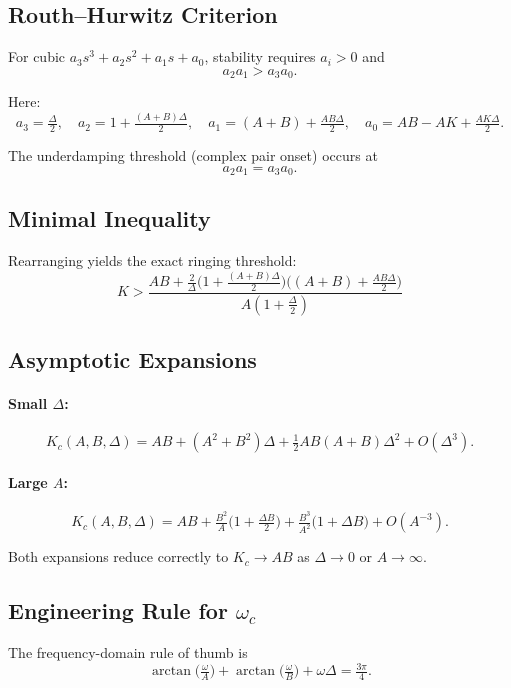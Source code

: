 \documentclass[12pt]{article}
\begin{document}
\subsection*{Routh--Hurwitz Criterion}

For cubic $a_3 s^3 + a_2 s^2 + a_1 s + a_0$, stability requires $a_i > 0$ and
\[
a_2 a_1 > a_3 a_0.
\]

Here:
\[
a_3 = \tfrac{\Delta}{2},\quad
a_2 = 1+\tfrac{(A+B)\Delta}{2},\quad
a_1 = (A+B)+\tfrac{AB\Delta}{2},\quad
a_0 = AB - AK + \tfrac{AK\Delta}{2}.
\]

The underdamping threshold (complex pair onset) occurs at
\[
a_2 a_1 = a_3 a_0.
\]

\subsection*{Minimal Inequality}

Rearranging yields the exact ringing threshold:
\[
\boxed{ \;
K > \frac{ AB + \tfrac{2}{\Delta}\Big(1+\tfrac{(A+B)\Delta}{2}\Big)\Big((A+B)+\tfrac{AB\Delta}{2}\Big) }{ A\left(1+\tfrac{\Delta}{2}\right) }
\;}
\]

\subsection*{Asymptotic Expansions}

\paragraph{Small $\Delta$:}
\[
K_c(A,B,\Delta) = AB + (A^2+B^2)\Delta + \tfrac{1}{2}AB(A+B)\Delta^2 + O(\Delta^3).
\]

\paragraph{Large $A$:}
\[
K_c(A,B,\Delta) = AB + \tfrac{B^2}{A}\Big(1+\tfrac{\Delta B}{2}\Big)
+ \tfrac{B^3}{A^2}\Big(1+\Delta B\Big) + O(A^{-3}).
\]

Both expansions reduce correctly to $K_c \to AB$ as $\Delta \to 0$ or $A \to \infty$.

\subsection*{Engineering Rule for $\omega_c$}

The frequency-domain rule of thumb is
\[
\arctan\!\Big(\tfrac{\omega}{A}\Big) + \arctan\!\Big(\tfrac{\omega}{B}\Big) + \omega \Delta = \tfrac{3\pi}{4}.
\]
\end{document}
